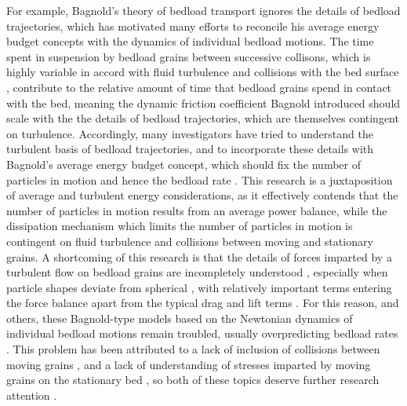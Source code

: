\documentclass{article}
\begin{document}
For example, Bagnold's theory of bedload transport ignores the details of bedload trajectories, which has motivated many efforts to reconcile his average energy budget concepts with the dynamics of individual bedload motions. 
The time spent in suspension by bedload grains between successive collisons, which is highly variable in accord with fluid turbulence and collisions with the bed surface \citep{Bialik2015}, contribute to the relative amount of time that bedload grains spend in contact with the bed, meaning the dynamic friction coefficient Bagnold introduced should scale with the the details of bedload trajectories, which are themselves contingent on turbulence. 
Accordingly, many investigators have tried to understand the turbulent basis of bedload trajectories, and to incorporate these details with Bagnold's average energy budget concept, which should fix the number of particles in motion and hence the bedload rate \citep{Abbott1977, Bridge1984, Wiberg1989, Bridge1992, Nino1998}.
This research is a juxtaposition of average and turbulent energy considerations, as it effectively contends that the number of particles in motion results from an average power balance, while the dissipation mechanism which limits the number of particles in motion is contingent on fluid turbulence and collisions between moving and stationary grains. 
A shortcoming of this research is that the details of forces imparted by a turbulent flow on bedload grains are incompletely understood \citep{Schmeeckle2007, Dwivedi2010, Dwivedi2011}, especially when particle shapes deviate from spherical \citep{Maxey1989}, with relatively important terms entering the force balance apart from the typical drag and lift terms \citep{Bialik2015}.
For this reason, and others, these Bagnold-type models based on the Newtonian dynamics of individual bedload motions remain troubled, usually overpredicting bedload rates \citep{Bridge1984, Bialik2015}. 
This problem has been attributed to a lack of inclusion of collisions between moving grains \citep{Lee2002}, and a lack of understanding of stresses imparted by moving grains on the stationary bed \citep{Nino1998}, so both of these topics deserve further research attention \citep{Bialik2015}. 
\end{document}

